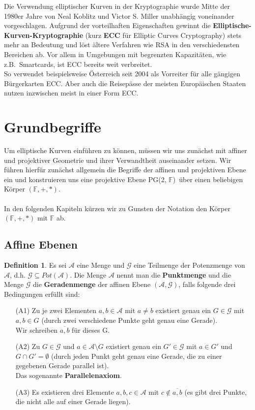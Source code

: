 \documentclass[hidelinks]{article}
\theoremstyle{plain}
\theoremstyle{definition}
\newtheorem{defn}[thm]{Definition}
\theoremstyle{rem}
\newcommand{\pgtwo}{PG(2, $\mathbb{F}$)\ }
\begin{document}
\begin{sloppypar}
Die Verwendung elliptischer Kurven in der Kryptographie wurde Mitte der 1980er Jahre von Neal Koblitz\cite{koblitz} und Victor S. Miller\cite{miller} unabhängig voneinander vorgeschlagen. Aufgrund der vorteilhaften Eigenschaften gewinnt die \textbf{Elliptische-Kurven-Kryptographie} (kurz \textbf{ECC} für Elliptic Curves Cryptography) stets mehr an Bedeutung und löst ältere Verfahren wie RSA in den verschiedensten Bereichen ab. Vor allem in Umgebungen mit begrenzten Kapazitäten, wie z.B.\ Smartcards, ist ECC bereits weit verbreitet.\\
So verwendet beispielsweise Österreich seit 2004 als Vorreiter für alle gängigen Bürgerkarten ECC.\cite{austria} Aber auch die Reisepässe der meisten Europäischen Staaten nutzen inzwischen meist in einer Form ECC.\cite{eu}


\section{Grundbegriffe}
Um elliptische Kurven einführen zu können, müssen wir uns zunächst mit affiner und projektiver Geometrie und ihrer Verwandtheit auseinander setzen. Wir führen hierfür zunächst allgemein die Begriffe der affinen und projektiven Ebene ein und konstruieren uns eine projektive Ebene \pgtwo über einen beliebigen Körper $(\mathbb{F},+,*)$.\\\\
In den folgenden Kapiteln kürzen wir zu Gunsten der Notation den Körper $(\mathbb{F},+,*)$ mit $\mathbb{F}$ ab.\\


\subsection{Affine Ebenen}
\begin{defn}  \label{affine-ebene}
Es sei $\mathcal{A}$ eine Menge und $\mathcal{G}$ eine Teilmenge der Potenzmenge von $\mathcal{A}$, d.h. $\mathcal{G}\subseteq Pot(\mathcal{A})$.
Die Menge $\mathcal{A}$ nennt man die \textbf{Punktmenge} und die Menge $\mathcal{G}$ die \textbf{Geradenmenge} der affinen Ebene $(\mathcal{A},\mathcal{G})$, falls folgende drei Bedingungen erfüllt sind:
	\begin{enumerate}
		\item[(A1)] Zu je zwei Elementen $a, b\in \mathcal{A}$ mit $a\ne b$ existiert genau ein $G\in\mathcal{G}$ mit $a, b \in G$ (durch zwei verschiedene Punkte geht genau eine Gerade).\\
		Wir schreiben $\overline{a,b}$ für dieses G.
		\item[(A2)] Zu $G\in\mathcal{G}$ und $a\in\mathcal{A}\setminus G$ existiert genau ein $G'\in\mathcal{G}$ mit $a\in G'$ und $G\cap G'=\emptyset$ (durch jeden Punkt geht genau eine Gerade, die zu einer gegebenen Gerade parallel ist).\\
		Das sogenannte \textbf{Parallelenaxiom}.
		\item[(A3)] Es existieren drei Elemente $a,b,c\in\mathcal{A}$ mit $c\notin\overline{a,b}$ (es gibt drei Punkte, die nicht alle auf einer Gerade liegen).
	\end{enumerate}
\end{defn}


\end{sloppypar}
\end{document}
